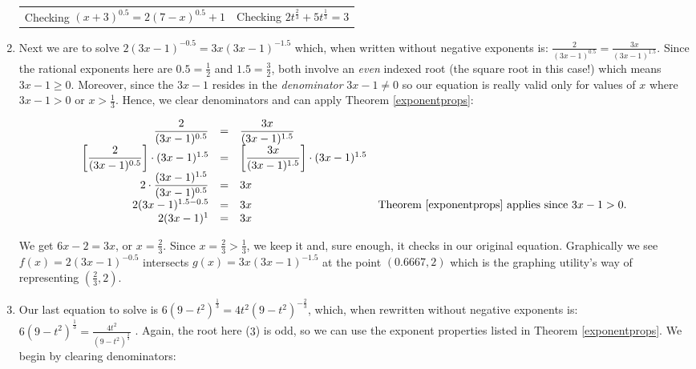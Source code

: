 \documentclass{ximera}
\begin{document}
\begin{ex}
\begin{enumerate}
\begin{center}
\begin{tabular}{cc}
Checking $(x+3)^{0.5} = 2(7-x)^{0.5}+1$ & Checking  $2t^{\frac{2}{3}} + 5t^{\frac{1}{3}} = 3$ \\

\end{tabular}

\end{center} 


\item Next we are to solve $2(3x-1)^{-0.5}  = 3x (3x-1)^{-1.5}$ which, when written without negative exponents is: $\frac{2}{(3x-1)^{0.5}} = \frac{3x}{(3x-1)^{1.5}}$.  Since the rational exponents here are $0.5 = \frac{1}{2}$ and $1.5 = \frac{3}{2}$, both involve an \textit{even} indexed root (the square root in this case!) which means $3x-1 \geq 0$.  Moreover, since the $3x-1$ resides in the \textit{denominator} $3x - 1 \neq 0$ so our equation is really valid only for values of $x$ where $3x-1>0$ or $x > \frac{1}{3}$.  Hence, we clear denominators and can apply Theorem \ref{exponentprops}:

\[ \begin{array}{rclr}

\dfrac{2}{(3x-1)^{0.5}} & = & \dfrac{3x}{(3x-1)^{1.5}} & \\

\left[ \dfrac{2}{(3x-1)^{0.5}} \right] \cdot (3x-1)^{1.5} & = & \left[  \dfrac{3x}{(3x-1)^{1.5}} \right ] \cdot (3x-1)^{1.5} & \\

2 \cdot \dfrac{(3x-1)^{1.5}}{(3x-1)^{0.5}} & = & 3x & \\

2 (3x-1)^{1.5-0.5} & = & 3x & \text{Theorem \ref{exponentprops} applies since $3x-1 > 0$.} \\

2 (3x-1)^{1} & = & 3x & \\  \end{array} \]

We get $6x-2 = 3x$, or $x = \frac{2}{3}$.  Since $x = \frac{2}{3} > \frac{1}{3}$, we keep it and, sure enough, it  checks in our original equation. Graphically we see $f(x)=2(3x-1)^{-0.5}$ intersects $g(x) = 3x (3x-1)^{-1.5}$ at the point $(0.6667, 2)$ which is the graphing utility's way of representing $\left(\frac{2}{3}, 2\right)$.

\item  Our last equation to solve is $6(9-t^2)^{\frac{1}{3}} = 4t^2 (9-t^2)^{-\frac{2}{3}}$, which, when rewritten without negative exponents is: $6(9-t^2)^{\frac{1}{3}} = \frac{4t^2}{(9-t^2)^{\frac{2}{3}}}$  .   Again, the root here ($3$) is odd, so we can use the exponent properties listed in Theorem \ref{exponentprops}.   We begin by clearing denominators: 



\end{enumerate}
\end{ex}
\end{document}
